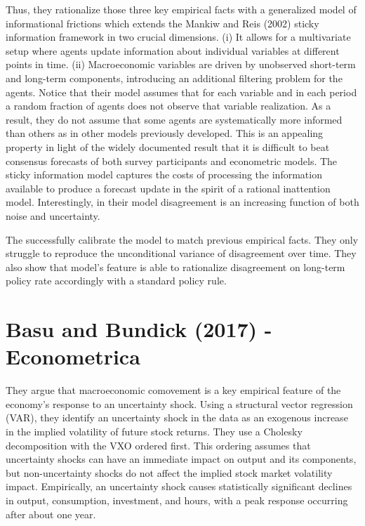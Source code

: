 \documentclass{article}
\begin{document}
{Thus, they rationalize those three key empirical facts with a generalized model of informational frictions which extends the Mankiw and Reis (2002) sticky information framework in two crucial dimensions. (i) It allows for a multivariate setup where agents update information about individual variables at different points in time. (ii) Macroeconomic variables are driven by unobserved short-term and long-term components, introducing an additional filtering problem for the agents. Notice that their model assumes that for each variable and in each period a random fraction of agents does not observe that variable realization. As a result, they do not assume that some agents are systematically more informed than others as in other models previously developed. This is an appealing property in light of the widely documented result that it is difficult to beat consensus forecasts of both survey participants and econometric models. The sticky information model captures the costs of processing the information available to produce a forecast update in the spirit of a rational inattention model. Interestingly, in their model disagreement is an increasing function of both noise and uncertainty. 

The successfully calibrate the model to match previous empirical facts. They only struggle to reproduce the unconditional variance of disagreement over time. They also show that model's feature is able to rationalize disagreement on long-term policy rate accordingly with a standard policy rule.

\section*{Basu and Bundick (2017) - Econometrica}

They argue that macroeconomic comovement is a key empirical feature of the economy's response to an uncertainty shock. Using a structural vector regression (VAR), they identify an uncertainty shock in the data as an exogenous increase in the implied volatility of future stock returns. They use a Cholesky decomposition with the VXO ordered first. This ordering assumes that uncertainty shocks can have an immediate impact on output and its components, but non-uncertainty shocks do not affect the implied stock market volatility impact. Empirically, an uncertainty shock causes statistically significant declines in output, consumption, investment, and hours, with a peak response occurring after about one year. 

}
\end{document}
